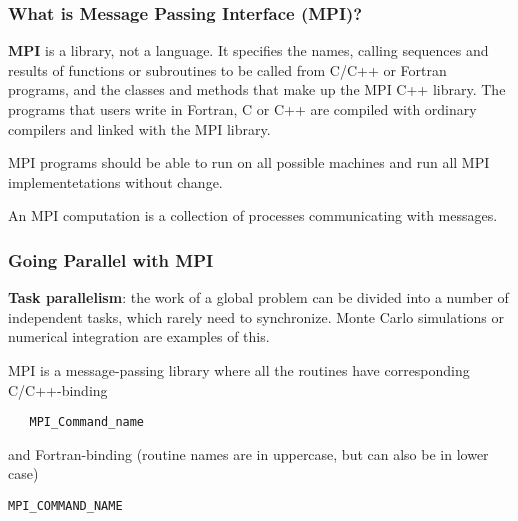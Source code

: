 \documentclass{beamer}
\begin{document}
\begin{frame}
\frametitle{What is Message Passing Interface (MPI)?}

\begin{block}{}

\textbf{MPI} is a library, not a language. It specifies the names, calling sequences and results of functions
or subroutines to be called from C/C++ or Fortran programs, and the classes and methods that make up the MPI C++
library. The programs that users write in Fortran, C or C++ are compiled with ordinary compilers and linked
with the MPI library.

MPI programs should be able to run
on all possible machines and run all MPI implementetations without change.

An MPI computation is a collection of processes communicating with messages.


\end{block}
\end{frame}

\begin{frame}
\frametitle{Going Parallel with MPI}

\begin{block}{}
\textbf{Task parallelism}: the work of a global problem can be divided
into a number of independent tasks, which rarely need to synchronize. 
Monte Carlo simulations or numerical integration are examples of this.


MPI is a message-passing library where all the routines
have corresponding C/C++-binding
\begin{verbatim}
   MPI_Command_name
\end{verbatim}
and Fortran-binding (routine names are in uppercase, but can also be in lower case)
\begin{Verbatim}[numbers=none,fontsize=\fontsize{9pt}{9pt},baselinestretch=0.95]
   MPI_COMMAND_NAME
\end{Verbatim}
\end{block}
\end{frame}
\end{document}
